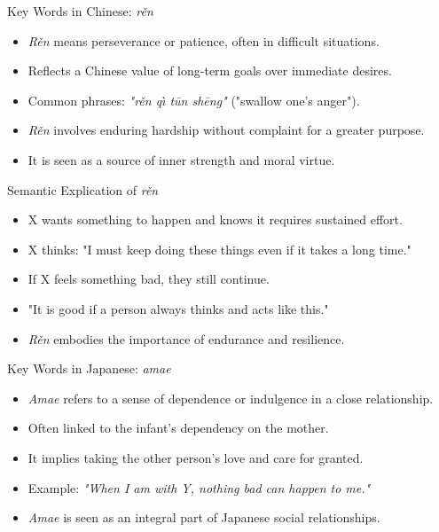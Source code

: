 \documentclass{beamer}
\begin{document}
\begin{frame}{Key Words in Chinese: \textit{rěn}}
    \begin{itemize}
        \item \textit{Rěn} means perseverance or patience, often in difficult situations.
        \item Reflects a Chinese value of long-term goals over immediate desires.
        \item Common phrases: \textit{"rěn qı̀ tūn shēng"} ("swallow one's anger").
        \item \textit{Rěn} involves enduring hardship without complaint for a greater purpose.
        \item It is seen as a source of inner strength and moral virtue.
    \end{itemize}
\end{frame}

\begin{frame}{Semantic Explication of \textit{rěn}}
    \begin{itemize}
        \item X wants something to happen and knows it requires sustained effort.
        \item X thinks: "I must keep doing these things even if it takes a long time."
        \item If X feels something bad, they still continue.
        \item "It is good if a person always thinks and acts like this."
        \item \textit{Rěn} embodies the importance of endurance and resilience.
    \end{itemize}
\end{frame}

\begin{frame}{Key Words in Japanese: \textit{amae}}
    \begin{itemize}
        \item \textit{Amae} refers to a sense of dependence or indulgence in a close relationship.
        \item Often linked to the infant's dependency on the mother.
        \item It implies taking the other person's love and care for granted.
        \item Example: \textit{"When I am with Y, nothing bad can happen to me."}
        \item \textit{Amae} is seen as an integral part of Japanese social relationships.
    \end{itemize}
\end{frame}
\end{document}
